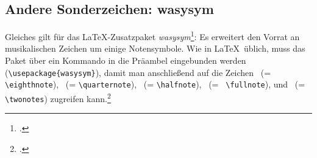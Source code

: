 %
%
%



\subsection{Andere Sonderzeichen: wasysym}

Gleiches gilt für das \LaTeX-Zusatzpaket \textit{wasysym}\footcite[vgl.][\nopage
wp]{CtanWasysym2018a}: Es erweitert den Vorrat an musikalischen Zeichen um
einige Notensymbole. Wie in \LaTeX\ üblich, muss das Paket über ein Kommando in
die Präambel eingebunden werden
(\texttt{\textbackslash{usepackage\{wasysym\}}}), damit man anschließend auf die
Zeichen \eighthnote \ (= \texttt{\small \textbackslash{eighthnote}}),
\quarternote \ (= \texttt{\small \textbackslash{quarternote}}), \halfnote \ (=
\texttt{\small \textbackslash{halfnote}}), \fullnote \ (= \texttt{\small
\textbackslash{fullnote}}), und \twonotes \ (= \texttt{\small
\textbackslash{twonotes}}) zugreifen kann.\footcite[vgl.][2]{Kielhorn2003a}

